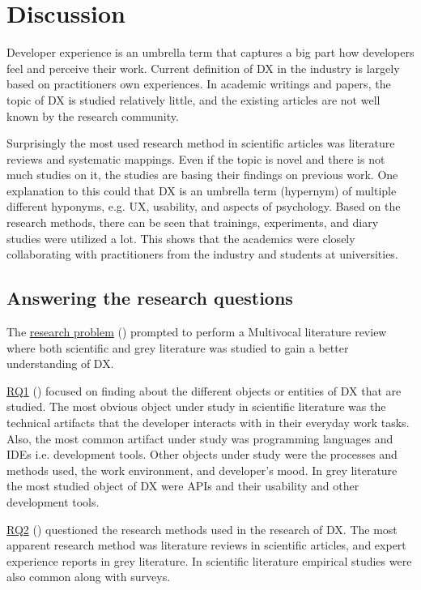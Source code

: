\documentclass[english, 12pt, a4paper, sci, utf8, a-1b, online]{aaltothesis}
\begin{document}
\clearpage
\section{Discussion} \label{section:discussion}

Developer experience is an umbrella term that captures a big part how developers feel and perceive their work. Current definition of DX in the industry is largely based on practitioners own experiences. In academic writings and papers, the topic of DX is studied relatively little, and the existing articles are not well known by the research community.

Surprisingly the most used research method in scientific articles was literature reviews and systematic mappings. Even if the topic is novel and there is not much studies on it, the studies are basing their findings on previous work. One explanation to this could that DX is an umbrella term (hypernym) of multiple different hyponyms, e.g. UX, usability, and aspects of psychology. Based on the research methods, there can be seen that trainings, experiments, and diary studies were utilized a lot. This shows that the academics were closely collaborating with practitioners from the industry and students at universities.

\subsection{Answering the research questions}

The \hyperref[research-problem]{research problem} (\researchproblem) prompted to perform a Multivocal literature review where both scientific and grey literature was studied to gain a better understanding of DX.

\hyperref[RQ1]{RQ1} (\rqone) focused on finding about the different objects or entities of DX that are studied. The most obvious object under study in scientific literature was the technical artifacts that the developer interacts with in their everyday work tasks. Also, the most common artifact under study was programming languages and IDEs i.e. development tools. Other objects under study were the processes and methods used, the work environment, and developer's mood. In grey literature the most studied object of DX were APIs and their usability and other development tools.

\hyperref[RQ2]{RQ2} (\rqtwo) questioned the research methods used in the research of DX. The most apparent research method was literature reviews in scientific articles, and expert experience reports in grey literature. In scientific literature empirical studies were also common along with surveys.
\end{document}
